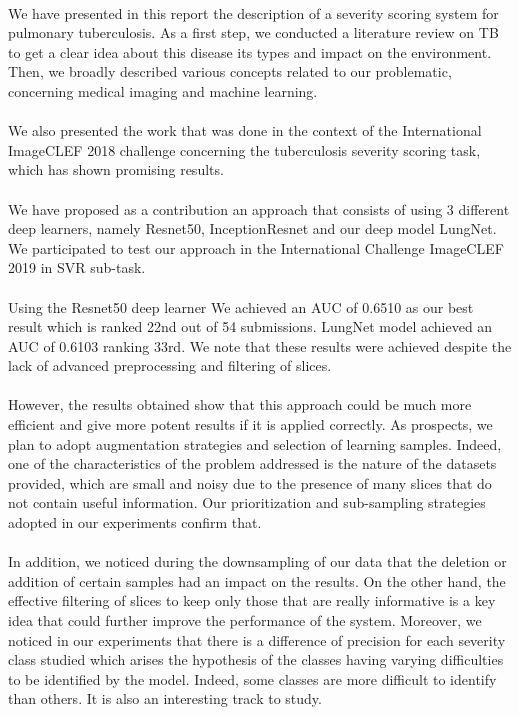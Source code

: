 \paragraph{}
We have presented in this report the description of a severity scoring system for pulmonary tuberculosis. As a first step, we conducted a literature review on TB to get a clear idea about this disease its types and impact on the environment. Then, we broadly described various concepts related to our problematic, concerning medical imaging and machine learning.
\paragraph{}
We also presented the work that was done in the context of the International ImageCLEF 2018 challenge concerning the tuberculosis severity scoring task, which has shown promising results.
\paragraph{}
We have proposed as a contribution an approach that consists of using 3 different deep learners, namely Resnet50, InceptionResnet and our deep model LungNet. We participated to test our approach in the International Challenge ImageCLEF 2019 in SVR sub-task. 
\paragraph{}
Using the Resnet50 deep learner We achieved an AUC of 0.6510  as our best result which is ranked 22nd out of 54 submissions. LungNet model achieved an AUC of 0.6103 ranking 33rd. We note that these results were achieved despite the lack of advanced preprocessing and filtering of slices. 
\paragraph{}
However, the results obtained show that this approach could be much more efficient and give more potent results if it is applied correctly. As prospects, we plan to adopt augmentation strategies and selection of learning samples. Indeed, one of the characteristics of the problem addressed is the nature of the datasets provided, which are small and noisy due to the presence of many slices that do not contain useful information. Our prioritization and sub-sampling strategies adopted in our experiments confirm that. 
\paragraph{}
In addition, we noticed during the downsampling of our data that the deletion or addition of certain samples had an impact on the results. On the other hand, the effective filtering of slices to keep only those that are really informative is a key idea that could further improve the performance of the system. Moreover, we noticed in our experiments that there is a difference of precision for each severity class studied which arises the hypothesis of the classes having varying difficulties to be identified by the model. Indeed, some classes are more difficult to identify than others. It is also an interesting track to study. 
